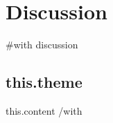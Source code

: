 \section{Discussion}

{{#with discussion}}
\subsection{{this.theme}}
{{this.content}}
{{/with}}






